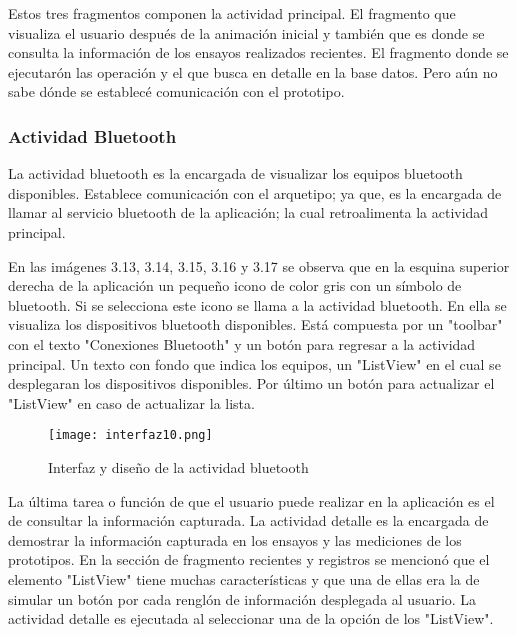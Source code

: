\par \noindent
Estos tres fragmentos componen la actividad principal. El fragmento que visualiza el usuario después de la animación inicial y también que es donde se consulta la información de los ensayos realizados recientes. El fragmento donde se ejecutarón las operación y el que busca en detalle en la base datos. Pero aún no sabe dónde se establecé comunicación con el prototipo. 

\subsubsection{Actividad Bluetooth}

\par 
La actividad bluetooth es la encargada de visualizar los equipos bluetooth disponibles. Establece comunicación con el arquetipo; ya que, es la encargada de llamar al servicio bluetooth de la aplicación; la cual retroalimenta la actividad principal.

\par \noindent
En las imágenes 3.13, 3.14, 3.15, 3.16 y 3.17 se observa que en la esquina superior derecha de la aplicación un pequeño icono de color gris con un símbolo de bluetooth. Si se selecciona este icono se llama a la actividad bluetooth. En ella se visualiza los dispositivos bluetooth disponibles. Está compuesta por un "toolbar" con el texto "Conexiones Bluetooth" y un botón para regresar a la actividad principal. Un texto con fondo que indica los equipos, un "ListView" en el cual se desplegaran los dispositivos disponibles. Por último un botón para actualizar el "ListView" en caso de actualizar la lista.

\begin{figure}[H]
	\centering
	\texttt{[image: interfaz10.png]}
	\caption{Interfaz y diseño de la actividad bluetooth}
\end{figure}

\par \noindent
La última tarea o función de que el usuario puede realizar en la aplicación es el de consultar la información capturada. La actividad detalle es la encargada de demostrar la información capturada en los ensayos y las mediciones de los prototipos. En la sección de fragmento recientes y registros se mencionó que el elemento "ListView" tiene muchas características y que una de ellas era la de simular un botón por cada renglón de información desplegada al usuario. La actividad detalle es ejecutada al seleccionar una de la opción de los "ListView".

